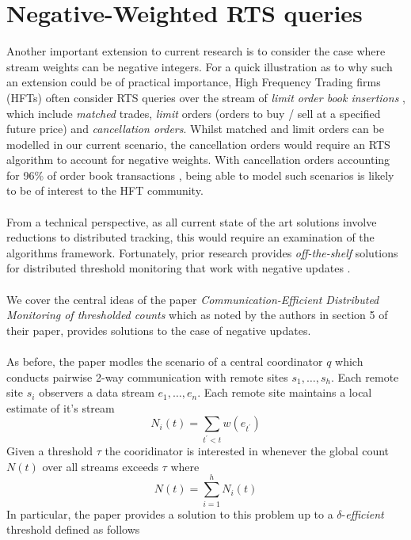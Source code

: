 \documentclass{article}
\begin{document}
\hspace{95mm}

\section*{Negative-Weighted RTS queries}


Another important extension to current research is to consider the case where stream weights can be negative integers. For a quick illustration as to why such an extension could be of practical importance, High Frequency Trading firms (HFTs) often consider RTS queries over the stream of \textit{limit order book insertions} \cite{HFTData}, which include \textit{matched} trades, \textit{limit} orders (orders to buy / sell at a specified future price) and \textit{cancellation orders}. Whilst matched and limit orders can be modelled in our current scenario, the cancellation orders would require an RTS algorithm to account for negative weights. With cancellation orders accounting for 96\% of order book transactions \citep{HFTData}, being able to model such scenarios is likely to be of interest to the HFT community. \\
\\
From a technical perspective, as all current state of the art solutions involve reductions to distributed tracking, this would require an examination of the algorithms framework. Fortunately, prior research provides \textit{off-the-shelf} solutions for distributed threshold monitoring that work with negative updates \cite{10.1145/1142473.1142507}. \\
\\
We cover the central ideas of the paper \textit{Communication-Efficient Distributed Monitoring of thresholded counts} \cite{10.1145/1142473.1142507} which as noted by the authors in section 5 of their paper, provides solutions to the case of negative updates. \\
\\
As before, the paper modles the scenario of a central coordinator $q$ which conducts pairwise 2-way communication with remote sites $s_1, \dots, s_h$. Each remote site $s_i$ observers a data stream $e_1, \dots, e_n$. Each remote site maintains a local estimate of it's stream
$$N_i(t) = \sum_{t^\prime < t} w(e_{t^\prime})$$
Given a threshold $\tau$ the cooridinator is interested in whenever the global count $N(t)$ over all streams exceeds $\tau$ where
$$N(t) = \sum_{i=1}^{h} N_i(t)$$
In particular, the paper provides a solution to this problem up to a $\delta$-\textit{efficient} threshold defined as follows 
\end{document}
